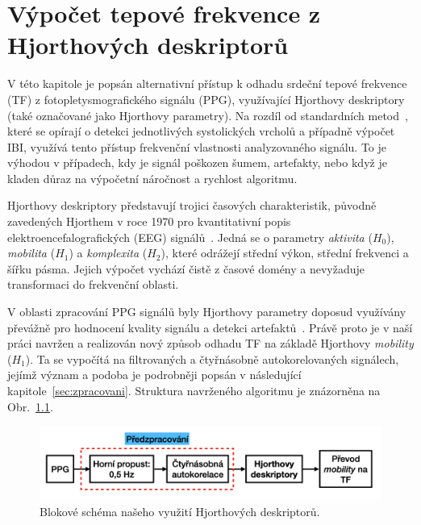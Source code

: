 \chapter{Výpočet tepové frekvence z Hjorthových deskriptorů}
\label{ch:hjorth}
V této kapitole je popsán alternativní přístup k odhadu srdeční tepové frekvence (\acs{TF}) z fotopletysmografického signálu (\acs{PPG}), využívající Hjorthovy deskriptory (také označované jako Hjorthovy parametry).
Na rozdíl od standardních metod~\cite{ENIKÖ,Charlton2022,NeuroKit2}, které se opírají o detekci jednotlivých systolických vrcholů a případně výpočet \acs{IBI}, využívá tento přístup frekvenční vlastnosti analyzovaného signálu.
To je výhodou v případech, kdy je signál poškozen šumem, artefakty, nebo když je kladen důraz na výpočetní náročnost a rychlost algoritmu.

Hjorthovy deskriptory představují trojici časových charakteristik, původně zavedených Hjorthem v roce 1970 pro kvantitativní popis elektroencefalografických (\acs{EEG}) signálů~\cite{Hjorth1973}.
Jedná se o parametry \textit{aktivita} (\(H_0\)), \textit{mobilita} (\(H_1\)) a \textit{komplexita} (\(H_2\)), které odrážejí střední výkon, střední frekvenci a šířku pásma.
Jejich výpočet vychází čistě z časové domény a nevyžaduje transformaci do frekvenční oblasti.

V oblasti zpracování \acs{PPG} signálů byly Hjorthovy parametry doposud využívány převážně pro hodnocení kvality signálu a detekci artefaktů~\cite{Peralta2017}. %
Právě proto je v naší práci navržen a realizován nový způsob odhadu \acs{TF} na základě Hjorthovy \textit{mobility} (\(H_1\)).
Ta se vypočítá na filtrovaných a čtyřnásobně autokorelovaných signálech, jejímž význam a podoba je podrobněji popsán v následující kapitole~\ref{sec:zpracovani}.
Struktura navrženého algoritmu je znázorněna na Obr.~\ref{fig:hjorth_schemata}.

\begin{figure}[h]
	\centering
	\includegraphics[width=1\textwidth]{./obrazky/hjorth_schema.png} %
	\caption[Schéma našeho algorimu, který využívá Hjorthových deskriptorů]{Blokové schéma našeho využití Hjorthových deskriptorů.}
	\label{fig:hjorth_schemata}
\end{figure}

